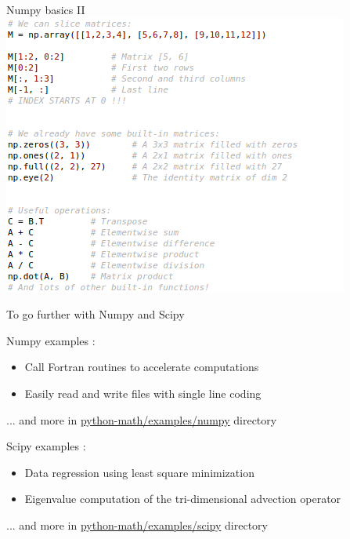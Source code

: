 \documentclass[11pt,unknownkeysallowed,usenames,dvipsnames]{beamer}
\begin{document}
\begin{frame}{Numpy basics II}
	\includegraphics[width=0.8\linewidth]{code-numpy2}
\end{frame}


\begin{frame}{To go further with Numpy and Scipy}
    \small
    \vspace{5pt}
    \begin{block}{Numpy examples :}
    \begin{itemize}
        \item Call Fortran routines to accelerate computations
        \item Easily read and write files with single line coding
    \end{itemize}
    \end{block}
    \vspace*{-7pt}
    ... and more in    
    \href{https://gitlab.unige.ch/Thibaut.Lunet/python-math/tree/master/examples/numpy}{python-math/examples/numpy} directory
    \vspace*{6pt}
    \begin{block}{Scipy examples :}
        \begin{itemize}
        \item Data regression using least square minimization
        \item Eigenvalue computation of the tri-dimensional advection operator
    \end{itemize}
    \end{block}
    \vspace*{-7pt}
    ... and more in    
    \href{https://gitlab.unige.ch/Thibaut.Lunet/python-math/tree/master/examples/scipy}{python-math/examples/scipy} directory \\
\end{frame}
\end{document}
